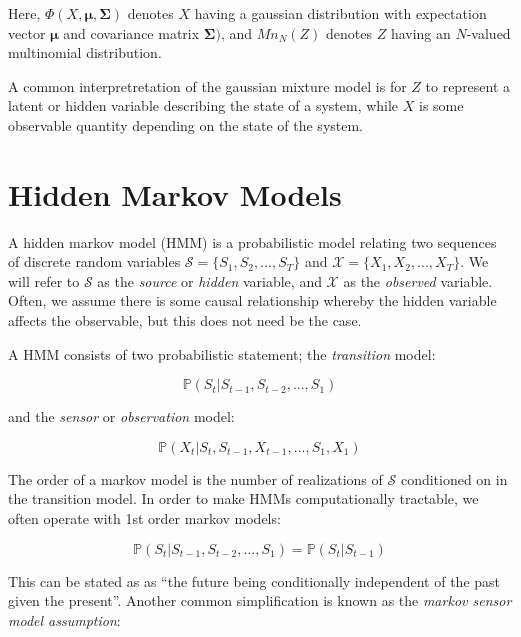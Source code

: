 \documentclass[11pt, oneside, a4paper]{report}
\begin{document}
Here, $\Phi(X,\mathbf{\mu}, \mathbf{\Sigma})$ denotes $X$ having a
gaussian distribution with expectation vector $\mathbf{\mu}$ and
covariance matrix $\mathbf{\Sigma})$, and $Mn_N(Z)$ denotes $Z$ having
an $N$-valued multinomial distribution.

A common interpretretation of the gaussian mixture model is for $Z$ to
represent a latent or hidden variable describing the state of a
system, while $X$ is some observable quantity depending on the state
of the system. 


\section{Hidden Markov Models}\label{hmm_appendix}
A hidden markov model (HMM) is a probabilistic model relating two sequences of
discrete random variables $\mathcal{S} = \{S_1, S_2, ..., S_T\}$ and
$\mathcal{X} = \{X_1, X_2, ..., X_T\}$. We will refer to
$\mathcal{S}$ as the \emph{source} or \emph{hidden} variable, and
$\mathcal{X}$ as the \emph{observed} variable. Often, we assume there
is some causal relationship whereby the hidden variable affects the
observable, but this does not need be the case. 

A HMM consists of two probabilistic statement; the \emph{transition}
model:

\begin{equation}
\mathbb{P}(S_t|S_{t-1}, S_{t-2},...,S_1)
\end{equation}


and the \emph{sensor} or \emph{observation} model:

\begin{equation}
\mathbb{P}(X_t|S_t, S_{t-1}, X_{t-1}, ...,
S_1, X_1)
\end{equation}


 The order of a markov model is the number of realizations
of $\mathcal{S}$ conditioned on in the transition model. In order to
make HMMs computationally tractable, we often operate with 1st order
markov models:

\begin{equation}\label{1st_order_markov}
  \mathbb{P}(S_t|S_{t-1}, S_{t-2},...,S_1)  =  \mathbb{P}(S_t|S_{t-1})
\end{equation}

This can be stated as as ``the future being conditionally independent of
the past given the present''. Another common simplification is known as the \emph{markov sensor model assumption}:
\end{document}
